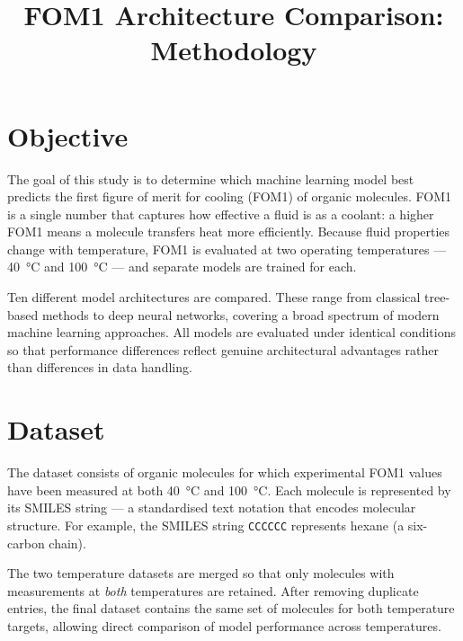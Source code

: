 \documentclass[11pt,a4paper]{article}
\title{FOM1 Architecture Comparison: Methodology}
\author{}
\date{}
\begin{document}
\maketitle

\section{Objective}

The goal of this study is to determine which machine learning model best predicts the first figure of merit for cooling (FOM1) of organic molecules. FOM1 is a single number that captures how effective a fluid is as a coolant: a higher FOM1 means a molecule transfers heat more efficiently. Because fluid properties change with temperature, FOM1 is evaluated at two operating temperatures --- \SI{40}{\degreeCelsius} and \SI{100}{\degreeCelsius} --- and separate models are trained for each.

Ten different model architectures are compared. These range from classical tree-based methods to deep neural networks, covering a broad spectrum of modern machine learning approaches. All models are evaluated under identical conditions so that performance differences reflect genuine architectural advantages rather than differences in data handling.

\section{Dataset}

The dataset consists of organic molecules for which experimental FOM1 values have been measured at both \SI{40}{\degreeCelsius} and \SI{100}{\degreeCelsius}. Each molecule is represented by its SMILES string --- a standardised text notation that encodes molecular structure. For example, the SMILES string \texttt{CCCCCC} represents hexane (a six-carbon chain).

The two temperature datasets are merged so that only molecules with measurements at \emph{both} temperatures are retained. After removing duplicate entries, the final dataset contains the same set of molecules for both temperature targets, allowing direct comparison of model performance across temperatures.

\end{document}
